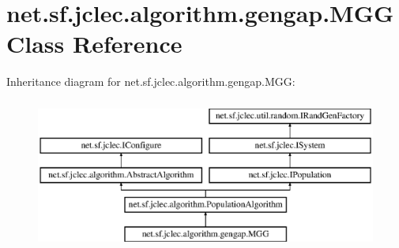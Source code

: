 \hypertarget{classnet_1_1sf_1_1jclec_1_1algorithm_1_1gengap_1_1_m_g_g}{\section{net.\-sf.\-jclec.\-algorithm.\-gengap.\-M\-G\-G Class Reference}
\label{classnet_1_1sf_1_1jclec_1_1algorithm_1_1gengap_1_1_m_g_g}
}
Inheritance diagram for net.\-sf.\-jclec.\-algorithm.\-gengap.\-M\-G\-G\-:\begin{figure}[H]
\begin{center}
\leavevmode
\includegraphics[height=5.000000cm]{classnet_1_1sf_1_1jclec_1_1algorithm_1_1gengap_1_1_m_g_g}
\end{center}
\end{figure}
